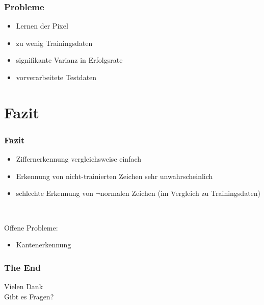 \documentclass[14pt]{beamer}
\theoremstyle{remark}
\begin{document}
\begin{frame}
	\frametitle{Probleme}
	\begin{itemize}
		\item Lernen der Pixel
		\item zu wenig Trainingsdaten
		\item signifikante Varianz in Erfolgsrate
		\item vorverarbeitete Testdaten
	\end{itemize}
\end{frame}

\section{Fazit}
\begin{frame}
	\frametitle{Fazit}
	\begin{itemize}
		\item Ziffernerkennung vergleichsweise einfach
		\item Erkennung von nicht-trainierten Zeichen sehr unwahrscheinlich
		\item schlechte Erkennung von \(\lnot\)normalen Zeichen (im Vergleich zu Trainingsdaten)
	\end{itemize}

	\mbox{ }

	Offene Probleme:
	\begin{itemize}
		\item Kantenerkennung
	\end{itemize}
\end{frame}


\begin{frame}
	\frametitle{The End}
	\begin{center}
		Vielen Dank\\[1ex]
		Gibt es Fragen?\\[5ex]
	\end{center}
\end{frame}
\end{document}
